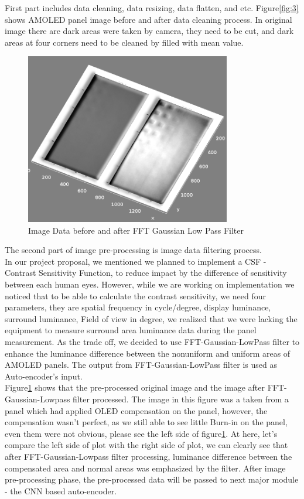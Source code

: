 \documentclass[runningheads]{llncs}
\begin{document}
First part includes data cleaning, data resizing, data flatten, and etc. Figure\ref{fig:3} shows AMOLED panel image before and after data cleaning process. In original image there are dark areas were taken by camera, they need to be cut, and dark areas at four corners need to be cleaned by filled with mean value.\\
\begin{figure}
    \centering
    \includegraphics[width=0.8\textwidth]{Surface_Plot_of_3D_plot_resized_fft_lowpass.png}
    \caption{Image Data before and after FFT Gaussian Low Pass Filter}
    \label{fig:4}
\end{figure}
The second part of image pre-processing is image data filtering process. \\
In our project proposal, we mentioned we planned to implement a CSF - Contrast Sensitivity Function, to reduce impact by the difference of sensitivity between each human eyes. However, while we are working on implementation we noticed that to be able to calculate the contrast sensitivity, we need four parameters, they are spatial frequency in cycle/degree, display luminance, surround luminance, Field of view in degree, we realized that we were lacking the equipment to measure surround area luminance data during the panel measurement. As the trade off, we decided to use FFT-Gaussian-LowPass filter to enhance the luminance difference between the nonuniform and uniform areas of AMOLED panels. The output from FFT-Gaussian-LowPass filter is used as Auto-encoder's input. \\

Figure\ref{fig:4} shows that the pre-processed original image and the image after FFT-Gaussian-Lowpass filter processed. The image in this figure was a taken from a panel which had applied OLED compensation on the panel, however, the compensation wasn't perfect, as we still able to see little Burn-in on the panel, even them were not obvious, please see the left side of figure\ref{fig:4}. At here, let's compare the left side of plot with the right side of plot, we can clearly see that after FFT-Gaussian-Lowpass filter processing, luminance difference between the compensated area and normal areas was emphasized by the filter.
After image pre-processing phase, the pre-processed data will be passed to next major module - the CNN based auto-encoder. 
\end{document}
